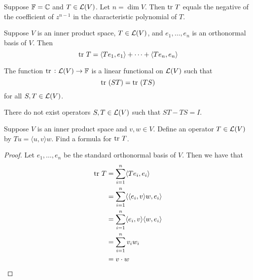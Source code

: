 \documentclass{extarticle}
\begin{document}
\begin{corollary}
    Suppose \(\mathbb{F} = \mathbb{C}\) and \(T \in \mathcal{L}(V)\). Let \(n = \dim V\). Then \(\text{tr} \ T\) equals the negative 
    of the coefficient of \(z^{n-1}\) in the characteristic polynomial of \(T\).
\end{corollary}

\begin{corollary}
    Suppose \(V\) is an inner product space, \(T \in \mathcal{L}(V)\), and \(e_1, \ldots, e_n\) is an orthonormal 
    basis of \(V\). Then 
    \[\text{tr} \ T = \langle Te_1,e_1 \rangle + \cdots + \langle Te_n,e_n \rangle\]
\end{corollary}

\begin{thm}
    The function \(\text{tr} \ \colon \mathcal{L}(V) \to \mathbb{F}\) is a linear functional on \(\mathcal{L}(V)\) such that 
    \[\text{tr} \ (ST) = \text{tr} \ (TS)\]
    for all \(S, T \in \mathcal{L}(V)\).
\end{thm}

\begin{corollary}
    There do not exist operators \(S, T \in \mathcal{L}(V)\) such that \(ST - TS = I\).
\end{corollary}


\newpage 
{}

\begin{problem}{1}
    Suppose \(V\) is an inner product space and \(v, w \in V\). Define an operator \(T \in \mathcal{L}(V)\)
    by \(Tu = \langle u,v \rangle w\). Find a formula for \(\text{tr} \ T\).
\end{problem}

\begin{proof}
Let \(e_1, \ldots, e_n\) be the standard orthonormal basis of \(V\). Then we have that 
\begin{align*}
    \text{tr} \ T 
    &= \sum_{i=1}^{n} \langle T e_i, e_i \rangle \\ 
    &= \sum_{i=1}^{n} \langle \langle e_i,v \rangle w, e_i \rangle \\ 
    &= \sum_{i=1}^{n} \langle e_i,v \rangle \langle w,e_i \rangle \\ 
    &= \sum_{i=1}^{n} v_i w_i \\ 
    &=  v \cdot w
\end{align*}
\end{proof}
\end{document}
